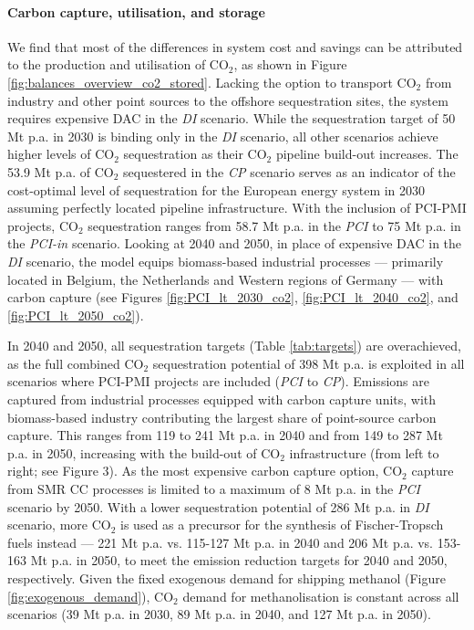 \documentclass[pdflatex,sn-nature]{sn-jnl}%
\theoremstyle{thmstyleone}%
\theoremstyle{thmstyletwo}%
\theoremstyle{thmstylethree}%
\begin{document}
\paragraph{Carbon capture, utilisation, and storage}
We find that most of the differences in system cost and savings can be attributed to the production and utilisation of CO$_2$, as shown in Figure \ref{fig:balances_overview_co2_stored}. Lacking the option to transport CO$_2$ from industry and other point sources to the offshore sequestration sites, the system requires expensive DAC in the \textit{DI} scenario. While the sequestration target of 50 Mt p.a. in 2030 is binding only in the \textit{DI} scenario, all other scenarios achieve higher levels of CO$_2$ sequestration as their CO$_2$ pipeline build-out increases. 
The 53.9 Mt p.a. of CO$_2$ sequestered in the \textit{CP} scenario serves as an indicator of the cost-optimal level of sequestration for the European energy system in 2030 assuming perfectly located pipeline infrastructure. With the inclusion of PCI-PMI projects, CO$_2$ sequestration ranges from 58.7 Mt p.a. in the \textit{PCI} to 75 Mt p.a. in the \textit{PCI-in} scenario. 
Looking at 2040 and 2050, in place of expensive DAC in the \textit{DI} scenario, the model equips biomass-based industrial processes --- primarily located in Belgium, the Netherlands and Western regions of Germany --- with carbon capture (see Figures \ref{fig:PCI_lt_2030_co2}, \ref{fig:PCI_lt_2040_co2}, and \ref{fig:PCI_lt_2050_co2}). 

In 2040 and 2050, all sequestration targets (Table \ref{tab:targets}) are overachieved, as the full combined CO$_2$ sequestration potential of 398 Mt p.a. is exploited in all scenarios where PCI-PMI projects are included (\textit{PCI} to \textit{CP}).  Emissions are captured from industrial processes equipped with carbon capture units, with biomass-based industry contributing the largest share of point-source carbon capture. This ranges from 119 to 241 Mt p.a. in 2040 and from 149 to 287 Mt p.a. in 2050, increasing with the build-out of CO$_2$ infrastructure (from left to right; see Figure 3). As the most expensive carbon capture option, CO$_2$ capture from SMR CC processes is limited to a maximum of 8 Mt p.a. in the \textit{PCI} scenario by 2050.
With a lower sequestration potential of 286 Mt p.a. in \textit{DI} scenario, more CO$_2$ is used as a precursor for the synthesis of Fischer-Tropsch fuels instead --- 221 Mt p.a. vs. 115-127 Mt p.a. in 2040 and 206 Mt p.a. vs. 153-163 Mt p.a. in 2050, to meet the emission reduction targets for 2040 and 2050, respectively. 
Given the fixed exogenous demand for shipping methanol (Figure \ref{fig:exogenous_demand}), CO$_2$ demand for methanolisation is constant across all scenarios (39 Mt p.a. in 2030, 89 Mt p.a. in 2040, and 127 Mt p.a. in 2050). 
\end{document}
